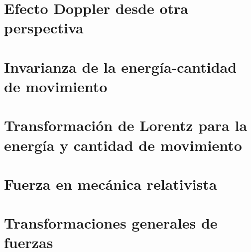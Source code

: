 \documentclass[../main]{subfiles}
\begin{document}
\chapter{Efecto Doppler desde otra perspectiva}

\chapter{Invarianza de la energía-cantidad de movimiento}

\chapter{Transformación de Lorentz para la energía y cantidad de movimiento}

\chapter{Fuerza en mecánica relativista}

\chapter{Transformaciones generales de fuerzas}
\end{document}
